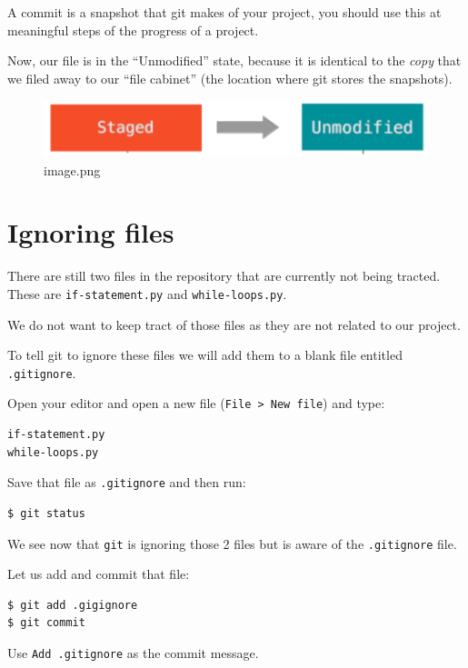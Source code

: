 \documentclass[11pt]{article}
\begin{document}
A commit is a snapshot that git makes of your project, you should use
this at meaningful steps of the progress of a project.

    Now, our file is in the ``Unmodified'' state, because it is identical to
the \emph{copy} that we filed away to our ``file cabinet'' (the location
where git stores the snapshots).

\begin{figure}
\centering
\includegraphics{static/unmodified.png}
\caption{image.png}
\end{figure}

    \hypertarget{ignoring-files}{%
\section{Ignoring files}\label{ignoring-files}}

There are still two files in the repository that are currently not being
tracted. These are \texttt{if-statement.py} and \texttt{while-loops.py}.

We do not want to keep tract of those files as they are not related to
our project.

To tell git to ignore these files we will add them to a blank file
entitled \texttt{.gitignore}.

Open your editor and open a new file
(\texttt{File\ \textgreater{}\ New\ file}) and type:

\begin{verbatim}
if-statement.py
while-loops.py
\end{verbatim}

Save that file as \texttt{.gitignore} and then run:

\begin{verbatim}
$ git status 
\end{verbatim}

We see now that \texttt{git} is ignoring those 2 files but is aware of
the \texttt{.gitignore} file.

Let us add and commit that file:

\begin{verbatim}
$ git add .gigignore
$ git commit
\end{verbatim}

Use \texttt{Add\ .gitignore} as the commit message.
\end{document}
